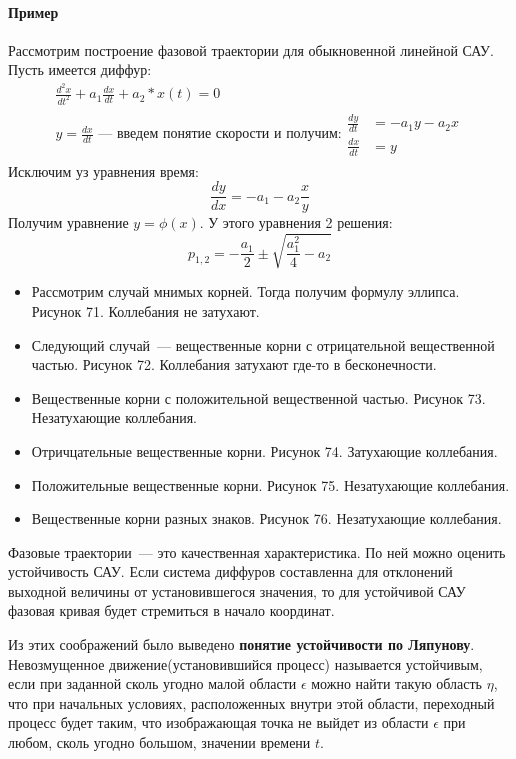 \paragraph{Пример} Рассмотрим построение фазовой траектории для обыкновенной линейной САУ. Пусть имеется диффур:
\begin{align*}
	\frac{d^2x}{dt^2}+a_1\frac{dx}{dt}+a_2*x(t)=0 \\
	y = \frac{dx}{dt} \text{~--- введем понятие скорости и получим:}
	\begin{array}{c}
		\frac{dy}{dt} &= -a_1y-a_2x \\
		\frac{dx}{dt} &= y
	\end{array}
\end{align*}
Исключим уз уравнения время:
$$
	\frac{dy}{dx} = -a_1-a_2\frac{x}{y}
$$
Получим уравнение $y=\phi(x)$. У этого уравнения 2 решения:
$$
	p_{1,2}=-\frac{a_1}2\pm\sqrt{\frac{a_1^2}4-a_2}
$$
\begin{itemize}
	\item Рассмотрим случай мнимых корней. Тогда получим формулу эллипса. Рисунок 71. Коллебания не затухают.

	\item Следующий случай~--- вещественные корни с отрицательной вещественной частью. Рисунок 72. Коллебания затухают где-то в бесконечности.

	\item Вещественные корни с положительной вещественной частью. Рисунок 73. Незатухающие коллебания.

	\item Отричцательные вещественные корни. Рисунок 74. Затухающие коллебания.
	
	\item Положительные вещественные корни. Рисунок 75. Незатухающие коллебания.
	
	\item Вещественные корни разных знаков. Рисунок 76. Незатухающие коллебания.
\end{itemize}
Фазовые траектории~--- это качественная характеристика. По ней можно оценить устойчивость САУ. Если система диффуров составленна для отклонений выходной величины от установившегося значения, то для устойчивой САУ фазовая кривая будет стремиться в начало координат.

Из этих соображений было выведено \textbf{понятие устойчивости по Ляпунову}. Невозмущенное движение(установившийся процесс) называется устойчивым, если при заданной сколь угодно малой области $\epsilon$ можно найти такую область $\eta$, что при начальных условиях, расположенных внутри этой области, переходный процесс будет таким, что изображающая точка не выйдет из области $\epsilon$ при любом, сколь угодно большом, значении времени $t$.

